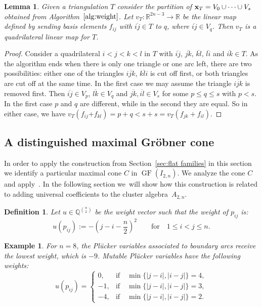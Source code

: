 \documentclass[pdftex]{sigma}%
\newtheorem{Lemma}[Theorem]{Lemma}
\newtheorem{Definition}[Theorem]{Definition}
\newtheorem{Example}[Theorem]{Example}
\numberwithin{equation}{section}
\DeclareMathOperator{\GF}{GF}
\begin{document}
\begin{Lemma}
Given a triangulation $T$ consider the partition of ${\bf x}_T=V_0\cup\dots\cup V_s$ obtained from Algorithm~$\ref{alg:weight}$.
Let $v_{T}\colon \mathbb R^{2n-3}\to \mathbb R$ be the linear map defined by sending basis elements ${f}_{{ij}}$ with $\overline{ij}\in T$ to $q$, where $\overline{ij}\in V_q$.
Then $v_T$ is a quadrilateral linear map for $T$.
\end{Lemma}
\begin{proof}
Consider a quadrilateral $i<j<k<l$ in $T$ with $\overline{ij}$, $\overline{jk}$, $\overline{kl}$, $\overline{li}$ and $\overline{ik}\in T$.
As the algorithm ends when there is only one triangle or one arc left, there are two possibilities: either one of the triangles $\overline{ijk}$, $\overline{kli}$ is cut off first, or both triangles are cut off at the same time.
In the first case we may assume the triangle $\overline{ijk}$ is removed first.
Then $\overline{ij}\in V_p$, $\overline{lk}\in V_q$ and $\overline{jk}, \overline{il}\in V_s$ for some $p\le q\le s$ with $p<s$.
In the first case $p$ and $q$ are different, while in the second they are equal.
So in either case,
we have $v_T({f}_{ij}{+f}_{kl})=p+q<s+s=v_T({f}_{jk}+{f}_{il})$.
\end{proof}


\subsection{A distinguished maximal Gr\"obner cone}
\label{sec:monomial_degeneration}
In order to apply the construction from Section~\ref{sec:flat families} in this section we identify a particular maximal cone $C$ in $\GF(I_{2,n})$.
We analyze the cone $C$ and apply~.
In the following section we~will show how this construction is related to adding universal coefficients to the cluster algebra~$A_{2,n}$.

\begin{Definition}
Let $u\in \mathbb Q^{\binom{n}{2}}$ be the weight vector such that the weight of $p_{ij}$ is:
 \begin{displaymath}
 u(p_{ij}):= -\left(j-i-\frac{n}{2}\right)^2\qquad \text{for}\quad 1\le i<j\le n.
 \end{displaymath}
\end{Definition}

\begin{Example}
For $n=8$, the Pl\"ucker variables associated to boundary arcs receive the lowest weight, which is $-9$. Mutable Pl\"ucker variables have the following weights:
\begin{displaymath}
u(p_{ij})=\begin{cases}
0, &\text{if}\quad \min\{\vert j-i\vert, \vert i-j\vert\}=4,\\
-1, &\text{if}\quad \min\{\vert j-i\vert, \vert i-j\vert\}=3, \\
-4, &\text{if}\quad \min\{\vert j-i\vert, \vert i-j\vert\}=2.
\end{cases}
\end{displaymath}

\end{Example}
\end{document}
